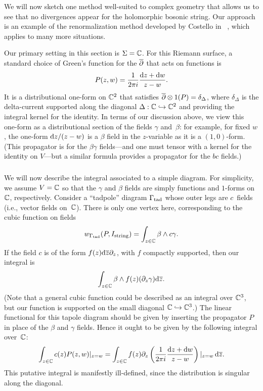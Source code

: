 We will now sketch one method well-suited to complex geometry
that allows us to see that no divergences appear for the holomorphic bosonic string.
Our approach is an example of the renormalization method developed by Costello in ~\cite{CosBook},
which applies to many more situations.

Our primary setting in this section is $\Sigma=\mathbb C$.
For this Riemann surface, 
a standard choice of Green's function for the $\overline{\partial}$ that acts on functions is
\[
P(z,w) = \frac{1}{2 \pi i} \frac{{\rm d} z + {\rm d} w}{z-w}.
\]
It is a distributional one-form on $\mathbb C^2$ that satisfies $\overline{\partial} \otimes 1(P) = \delta_\Delta$, 
where $\delta_\Delta$ is the delta-current supported along the diagonal $\Delta: \mathbb C \hookrightarrow \mathbb C^2$ and providing the integral kernel for the identity.
In terms of our discussion above,
we view this one-form as a distributional section of the fields $\gamma$ and~$\beta$: 
for example, for fixed $w$, the one-form ${\rm d} z/(z - w)$ is a $\beta$ field in the $z$-variable 
as it is a $(1,0)$-form.
(This propagator is for the $\beta\gamma$ fields---and one must tensor with a kernel for the identity on $V$---but a similar formula provides a propagator for the $bc$ fields.)

\subsubsection{}

We will now describe the integral associated to a simple diagram.
For simplicity, we assume $V = \mathbb C$ so that the $\gamma$ and $\beta$ fields are simply functions and $1$-forms on $\mathbb C$, respectively.
Consider a ``tadpole'' diagram $\Gamma_{\rm tad}$ whose outer legs are $c$~fields 
(i.e., vector fields on~$\mathbb C$).
There is only one vertex here, corresponding to the cubic function on fields
\[
w_{\Gamma_{\rm tad}}(P,I_{\rm string}) = \int_{z \in \mathbb C} \beta \wedge c\gamma.
\]
If the field $c$ is of the form $f(z) {\rm d} \overline{z} \partial_z$,
with $f$ compactly supported, 
then our integral is
\[
\int_{z \in \mathbb C} \beta \wedge f(z)(\partial_z\gamma) {\rm d} \overline{z}.
\]
(Note that a general cubic function could be described as an integral over $\mathbb C^3$,
but our function is supported on the small diagonal $\mathbb C \hookrightarrow \mathbb C^3$.)
The linear functional for this tapole diagram should be given by inserting the propagator $P$ in place of the $\beta$ and $\gamma$ fields. 
Hence it ought to be given by the following integral over~$\mathbb C$:
\[
\int_{z \in \mathbb C} c(z)P(z,w)|_{z = w}  
= \int_{z \in \mathbb C} f(z) \partial_z \left(  \frac{1}{2 \pi i} \frac{{\rm d} z + {\rm d} w}{z-w}\right)|_{z = w}\, {\rm d} \overline{z}.
\]
This putative integral is manifestly ill-defined,
since the distribution is singular along the diagonal.

